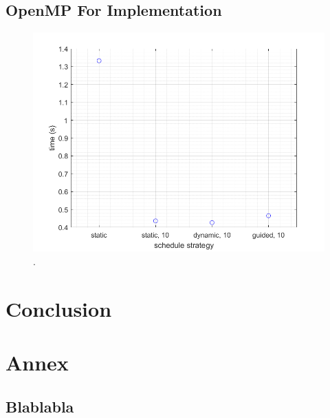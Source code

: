 \documentclass[12pt, a4paper]{article}
\begin{document}
\subsection{OpenMP For Implementation}

\begin{figure}[H]
  \centering
  \includegraphics[scale=0.5]{./mandel-omp-for-schedule}
  \caption{.}
  \label{fig:mandel-omp-for-schedule}
\end{figure}

\section{Conclusion}

\section{Annex}

\subsection{Blablabla}
\end{document}
